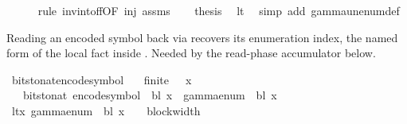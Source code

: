 \begin{isabellebody}
\ \ \ \ \isamarkupfalse%
\ {\isacharparenleft}{\kern0pt}rule\ inv{\isacharunderscore}{\kern0pt}into{\isacharunderscore}{\kern0pt}f{\isacharunderscore}{\kern0pt}f{\isacharbrackleft}{\kern0pt}OF\ inj\ assms{\isacharparenleft}{\kern0pt}{}{\isacharparenright}{\kern0pt}{\isacharbrackright}{\kern0pt}{\isacharparenright}{\kern0pt}\isanewline
\ \ \isamarkupfalse%
\ {\isacharquery}{\kern0pt}thesis\ \isamarkupfalse%
\ lt\ \isamarkupfalse%
\ {\isacharparenleft}{\kern0pt}simp\ add{\isacharcolon}{\kern0pt}\ gamma{\isacharunderscore}{\kern0pt}unenum{\isacharunderscore}{\kern0pt}def{\isacharparenright}{\kern0pt}\isanewline
{}\isamarkupfalse%
%
\endisatagproof
{\isafoldproof}%
%
\isadelimproof
%
\endisadelimproof
%
\begin{isamarkuptext}%
Reading an encoded symbol back via 
  recovers its enumeration index, the named form of the local
   fact inside .  Needed
  by the read-phase accumulator below.%
\end{isamarkuptext}\isamarkuptrue%
\isamarkupfalse%
\ bits{\isacharunderscore}{\kern0pt}to{\isacharunderscore}{\kern0pt}nat{\isacharunderscore}{\kern0pt}encode{\isacharunderscore}{\kern0pt}symbol{\isacharcolon}{\kern0pt}\isanewline
\ \ \ {\isachardoublequoteopen}finite\ {\isasymGamma}{\isachardoublequoteclose}\ \ {\isachardoublequoteopen}x\ {\isasymin}\ {\isasymGamma}{\isachardoublequoteclose}\isanewline
\ \ \ {\isachardoublequoteopen}bits{\isacharunderscore}{\kern0pt}to{\isacharunderscore}{\kern0pt}nat\ {\isacharparenleft}{\kern0pt}encode{\isacharunderscore}{\kern0pt}symbol\ {\isasymGamma}\ bl\ x{\isacharparenright}{\kern0pt}\ {\isacharequal}{\kern0pt}\ gamma{\isacharunderscore}{\kern0pt}enum\ {\isasymGamma}\ bl\ x{\isachardoublequoteclose}\isanewline
%
\isadelimproof
%
\endisadelimproof
%
\isatagproof
{}\isamarkupfalse%
\ {\isacharminus}{\kern0pt}\isanewline
\ \ \isamarkupfalse%
\ lt{\isacharunderscore}{\kern0pt}x{\isacharcolon}{\kern0pt}\ {\isachardoublequoteopen}gamma{\isacharunderscore}{\kern0pt}enum\ {\isasymGamma}\ bl\ x\ {\isacharless}{\kern0pt}\ {}\ {\isacharcircum}{\kern0pt}\ block{\isacharunderscore}{\kern0pt}width\ {\isasymGamma}{\isachardoublequoteclose}\isanewline

\end{isabellebody}
